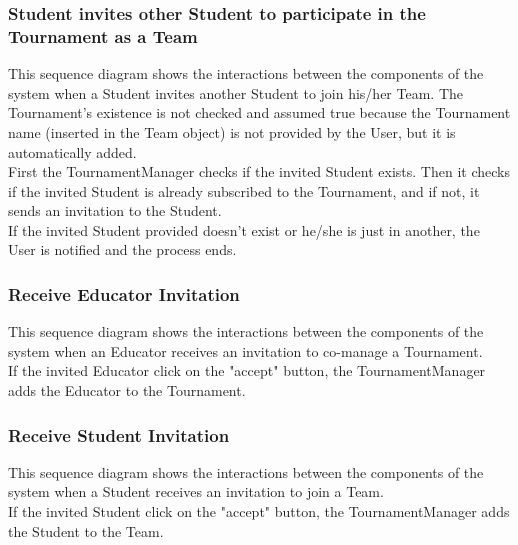 \begin{landscape}
\clearpage
\subsubsection{Student invites other Student to participate in the Tournament as a Team}
This sequence diagram shows the interactions between the components of the system when a Student invites another Student to join his/her Team. The Tournament's existence is not checked and assumed true because the Tournament name (inserted
in the Team object) is not provided by the User, but it is automatically added.\\
First the TournamentManager checks if the invited Student exists. Then it checks if the invited Student is already subscribed to the Tournament, and if not, it sends an invitation to the Student.\\
If the invited Student provided doesn't exist or he/she is just in another, the User is notified and the process ends.\\

\clearpage
\subsubsection{Receive Educator Invitation}
This sequence diagram shows the interactions between the components of the system when an Educator receives an invitation to co-manage a Tournament.\\
If the invited Educator click on the "accept" button, the TournamentManager adds the Educator to the Tournament.\\

\clearpage
\subsubsection{Receive Student Invitation}
This sequence diagram shows the interactions between the components of the system when a Student receives an invitation to join a Team.\\
If the invited Student click on the "accept" button, the TournamentManager adds the Student to the Team.\\


\end{landscape}

